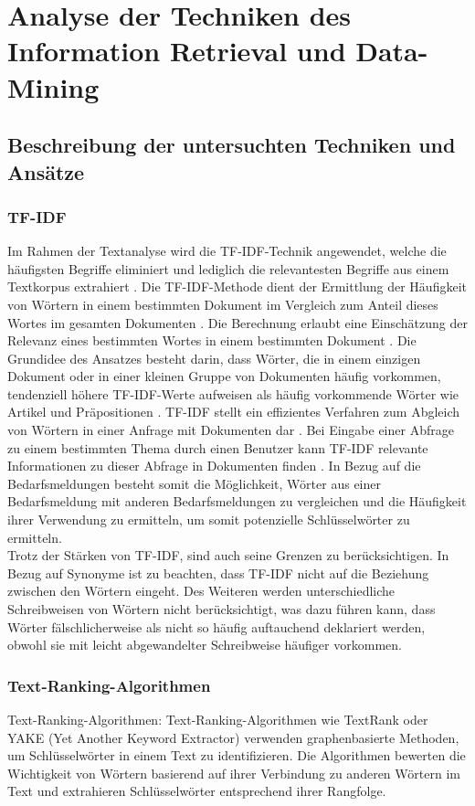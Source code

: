 \chapter{Analyse der Techniken des Information Retrieval und Data-Mining}
\label{chap:staffingadvisor}

\section{Beschreibung der untersuchten Techniken und Ansätze}

\subsection{TF-IDF}
Im Rahmen der Textanalyse wird die TF-IDF-Technik angewendet, welche die häufigsten Begriffe eliminiert und lediglich die relevantesten Begriffe aus einem Textkorpus extrahiert \cite{bafna2016document}. Die TF-IDF-Methode dient der Ermittlung der Häufigkeit von Wörtern in einem bestimmten Dokument im Vergleich zum Anteil dieses Wortes im gesamten Dokumenten \cite{ramos2003using}. Die Berechnung erlaubt eine Einschätzung der Relevanz eines bestimmten Wortes in einem bestimmten Dokument \cite{ramos2003using}. Die Grundidee des Ansatzes besteht darin, dass Wörter, die in einem einzigen Dokument oder in einer kleinen Gruppe von Dokumenten häufig vorkommen, tendenziell höhere TF-IDF-Werte aufweisen als häufig vorkommende Wörter wie Artikel und Präpositionen \cite{ramos2003using}. TF-IDF stellt ein effizientes Verfahren zum Abgleich von Wörtern in einer Anfrage mit Dokumenten dar \cite{ramos2003using}. Bei Eingabe einer Abfrage zu einem bestimmten Thema durch einen Benutzer kann TF-IDF relevante Informationen zu dieser Abfrage in Dokumenten finden \cite{ramos2003using}. In Bezug auf die Bedarfsmeldungen besteht somit die Möglichkeit, Wörter aus einer Bedarfsmeldung mit anderen Bedarfsmeldungen zu vergleichen und die Häufigkeit ihrer Verwendung zu ermitteln, um somit potenzielle Schlüsselwörter zu ermitteln.\\

Trotz der Stärken von TF-IDF, sind auch seine Grenzen zu berücksichtigen. In Bezug auf Synonyme ist zu beachten, dass TF-IDF nicht auf die Beziehung zwischen den Wörtern eingeht. Des Weiteren werden unterschiedliche Schreibweisen von Wörtern nicht berücksichtigt, was dazu führen kann, dass Wörter fälschlicherweise als nicht so häufig auftauchend deklariert werden, obwohl sie mit leicht abgewandelter Schreibweise häufiger vorkommen.
\subsection{Text-Ranking-Algorithmen}
Text-Ranking-Algorithmen: Text-Ranking-Algorithmen wie TextRank oder YAKE (Yet Another Keyword Extractor) verwenden graphenbasierte Methoden, um Schlüsselwörter in einem Text zu identifizieren. Die Algorithmen bewerten die Wichtigkeit von Wörtern basierend auf ihrer Verbindung zu anderen Wörtern im Text und extrahieren Schlüsselwörter entsprechend ihrer Rangfolge.\\ \cite{mihalcea2004textrank}\cite{zhang2020empirical}\cite{pay2019ensemble}\\

